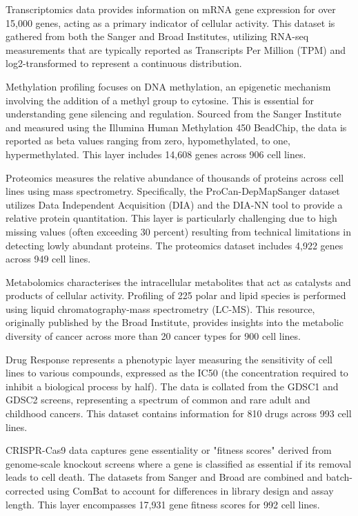 Transcriptomics data provides information on mRNA gene expression for over 15,000 genes, acting as a primary indicator of cellular activity. This dataset is gathered from both the Sanger and Broad Institutes, utilizing RNA-seq measurements that are typically reported as Transcripts Per Million (TPM) and log2-transformed to represent a continuous distribution.

Methylation profiling focuses on DNA methylation, an epigenetic mechanism involving the addition of a methyl group to cytosine. This is essential for understanding gene silencing and regulation. Sourced from the Sanger Institute and measured using the Illumina Human Methylation 450 BeadChip, the data is reported as beta values ranging from zero, hypomethylated, to one, hypermethylated. This layer includes 14,608 genes across 906 cell lines.

Proteomics measures the relative abundance of thousands of proteins across cell lines using mass spectrometry. Specifically, the ProCan-DepMapSanger dataset utilizes Data Independent Acquisition (DIA) and the DIA-NN tool to provide a relative protein quantitation. This layer is particularly challenging due to high missing values (often exceeding 30 percent) resulting from technical limitations in detecting lowly abundant proteins. The proteomics dataset includes 4,922 genes across 949 cell lines.

Metabolomics characterises the intracellular metabolites that act as catalysts and products of cellular activity. Profiling of 225 polar and lipid species is performed using liquid chromatography-mass spectrometry (LC-MS). This resource, originally published by the Broad Institute, provides insights into the metabolic diversity of cancer across more than 20 cancer types for 900 cell lines.

Drug Response represents a phenotypic layer measuring the sensitivity of cell lines to various compounds, expressed as the IC50 (the concentration required to inhibit a biological process by half). The data is collated from the GDSC1 and GDSC2 screens, representing a spectrum of common and rare adult and childhood cancers. This dataset contains information for 810 drugs across 993 cell lines.

CRISPR-Cas9 data captures gene essentiality or "fitness scores" derived from genome-scale knockout screens where a gene is classified as essential if its removal leads to cell death. The datasets from Sanger and Broad are combined and batch-corrected using ComBat to account for differences in library design and assay length. This layer encompasses 17,931 gene fitness scores for 992 cell lines.

